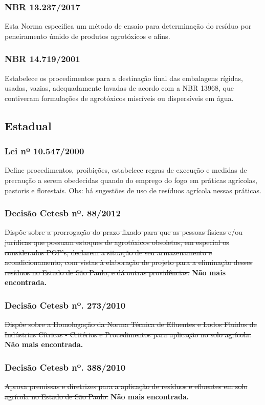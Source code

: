 \begin{subapend}
\begin{subsubapend}
		\subsubsection{NBR 13.237/2017} 
		Esta Norma especifica um método de ensaio para determinação do resíduo por peneiramento úmido de produtos agrotóxicos e afins. 
		\subsubsection{NBR 14.719/2001}
		Estabelece os procedimentos para a destinação final das embalagens rígidas, usadas, vazias, adequadamente lavadas de acordo com a NBR 13968, que contiveram formulações de agrotóxicos miscíveis ou dispersíveis em água.
		\subsection{Estadual}
		\subsubsection{Lei nº 10.547/2000}
		Define procedimentos, proibições, estabelece regras de execução e medidas de precaução a serem obedecidas quando do emprego do fogo em práticas agrícolas, pastoris e florestais. Obs: há sugestões de uso de resíduos agrícola nessas práticas.
		\subsubsection{Decisão Cetesb nº. 88/2012}
		\sout{Dispõe sobre a prorrogação do prazo fixado para que as pessoas físicas e/ou jurídicas que possuam estoques de agrotóxicos obsoletos, em especial os considerados POP's, declarem a situação de seu armazenamento e acondicionamento, com vistas à elaboração de projeto para a eliminação desses resíduos no Estado de São Paulo, e dá outras providências.} \textbf{Não mais encontrada.}
		\subsubsection{Decisão Cetesb nº. 273/2010}
		\sout{Dispõe sobre a Homologação da Norma Técnica de Efluentes e Lodos Fluidos de Indústrias Cítricas - Critérios e Procedimentos para aplicação no solo agrícola.} \textbf{Não mais encontrada.}
		\subsubsection{Decisão Cetesb nº. 388/2010}
		\sout{Aprova premissas e diretrizes para a aplicação de resíduos e efluentes em solo agrícola no Estado de São Paulo.} \textbf{Não mais encontrada.}

\end{subsubapend}
\end{subapend}
